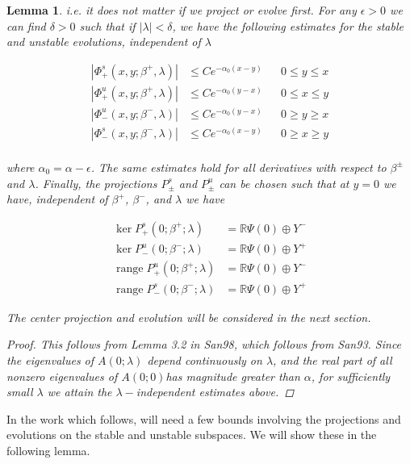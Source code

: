 \documentclass[12pt]{article}
\def\R{{\mathbb R}}
\DeclareMathOperator{\ran}{range}
\newtheorem{lemma}{Lemma}
\begin{document}
\begin{lemma}
i.e. it does not matter if we project or evolve first. For any $\epsilon > 0$ we can find $\delta > 0$ such that if $|\lambda| < \delta$, we have the following estimates for the stable and unstable evolutions, independent of $\lambda$

\begin{align*}
|\Phi^s_+(x, y; \beta^+, \lambda)| &\leq C e^{-\alpha_0(x - y)} && 0 \leq y \leq x \\
|\Phi^u_+(x, y; \beta^+, \lambda)| &\leq C e^{-\alpha_0(y - x)} && 0 \leq x \leq y \\
|\Phi^u_-(x, y; \beta^-, \lambda)| &\leq C e^{-\alpha_0(y - x)} && 0 \geq y \geq x \\
|\Phi^s_-(x, y; \beta^-, \lambda)| &\leq C e^{-\alpha_0(x - y)} && 0 \geq x \geq y \\
\end{align*}

where $\alpha_0 = \alpha - \epsilon$. The same estimates hold for all derivatives with respect to $\beta^\pm$ and $\lambda$. Finally, the projections $P^s_\pm$ and $P^u_\pm$ can be chosen such that at $y = 0$ we have, independent of $\beta^+$, $\beta^-$, and $\lambda$ we have

\begin{align*}
\ker P^s_+(0; \beta^+; \lambda) &= \R \Psi(0) \oplus Y^- \\
\ker P^u_-(0; \beta^-; \lambda) &= \R \Psi(0) \oplus Y^+ \\
\ran P^u_+(0; \beta^+; \lambda) &= \R \Psi(0) \oplus Y^- \\
\ran P^s_-(0; \beta^-; \lambda) &= \R \Psi(0) \oplus Y^+
\end{align*}

The center projection and evolution will be considered in the next section.

\begin{proof}
This follows from Lemma 3.2 in San98, which follows from San93. Since the eigenvalues of $A(0; \lambda)$ depend continuously on $\lambda$, and the real part of all nonzero eigenvalues of $A(0; 0)$has magnitude greater than $\alpha$, for sufficiently small $\lambda$ we attain the $\lambda-$independent estimates above. 
\end{proof}
\end{lemma}

In the work which follows, will need a few bounds involving the projections and evolutions on the stable and unstable subspaces. We will show these in the following lemma.
\end{document}
